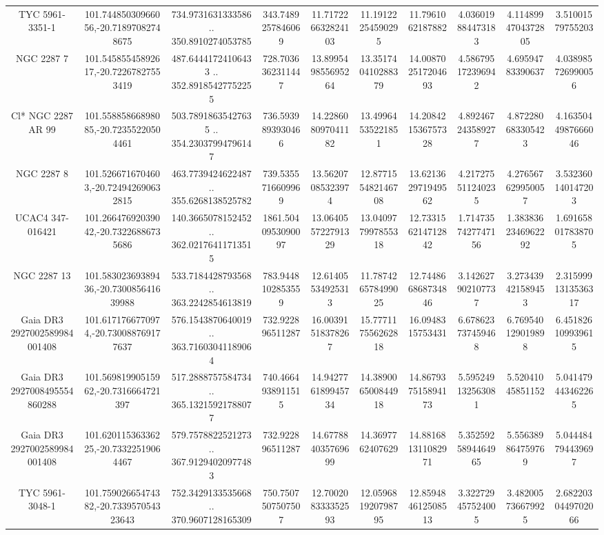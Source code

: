 \begin{table}
\begin{tabular}{cccccccccc}
TYC 5961-3351-1 & 101.74485030966056,-20.71897082748675 & 734.9731631333586 .. 350.8910274053785 & 343.7489257846069 & 11.717226632824103 & 11.19122254590295 & 11.7961062187882 & 4.036019884473183 & 4.1148994704372805 & 3.51001579755203 \\
NGC  2287     7 & 101.54585545892617,-20.72267827553419 & 487.64441724106433 .. 352.89185427752255 & 728.7036362311447 & 13.899549855695264 & 13.351740410288379 & 14.008702517204693 & 4.586795172396942 & 4.69594783390637 & 4.038985726990056 \\
Cl* NGC 2287     AR      99 & 101.55885866898085,-20.72355220504461 & 503.78918635427635 .. 354.23037994796147 & 736.5939893930466 & 14.228608097041182 & 13.49964535221851 & 14.208421536757328 & 4.892467243589277 & 4.872280683305423 & 4.1635044987666046 \\
NGC  2287     8 & 101.5266716704603,-20.724942690632815 & 463.7739424622487 .. 355.6268138525782 & 739.5355716609969 & 13.56207085323974 & 12.877155482146708 & 13.621362971949562 & 4.217275511240235 & 4.276567629950057 & 3.532360140147203 \\
UCAC4 347-016421 & 101.26647692039042,-20.73226886735686 & 140.3665078152452 .. 362.02176411713515 & 1861.5040953090097 & 13.064055722791329 & 13.040977997855318 & 12.733156214712842 & 1.7147357427747156 & 1.3838362346962292 & 1.691658017838705 \\
NGC  2287    13 & 101.58302369389436,-20.730085641639988 & 533.7184428793568 .. 363.2242854613819 & 783.9448102853559 & 12.61405534925313 & 11.787426578499025 & 12.744866868734846 & 3.142627902107737 & 3.273439421589453 & 2.3159991313536317 \\
Gaia DR3 2927002589984001408 & 101.6171766770974,-20.730088769177637 & 576.1543870640019 .. 363.71603041189064 & 732.922896511287 & 16.00391518378267 & 15.777117556262818 & 16.0948315753431 & 6.678623737459468 & 6.769540129019898 & 6.451826109939615 \\
Gaia DR3 2927008495554860288 & 101.56981990515962,-20.7316664721397 & 517.2888757584734 .. 365.13215921788077 & 740.4664938911515 & 14.942776189945734 & 14.389006500844918 & 14.867937515894173 & 5.595249132563081 & 5.52041045851152 & 5.041479443462265 \\
Gaia DR3 2927002589984001408 & 101.62011536336225,-20.73322519064467 & 579.7578822521273 .. 367.91294020977483 & 732.922896511287 & 14.677884035769699 & 14.3697762407629 & 14.881681311082971 & 5.3525925894464965 & 5.556389864759769 & 5.044484794439697 \\
TYC 5961-3048-1 & 101.75902665474382,-20.733957054323643 & 752.3429133535668 .. 370.9607128165309 & 750.7507507507507 & 12.700208333352593 & 12.059681920798795 & 12.859484612508513 & 3.322729457524005 & 3.482005736679925 & 2.6822030449702066 \\

\end{tabular}
\end{table}
